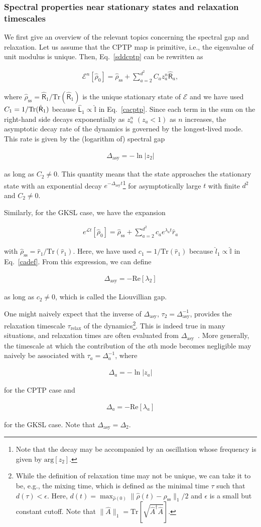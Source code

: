 \documentclass[preprint,pteplogo]{ptephy_v2}%
\numberwithin{equation}{section}
\theoremstyle{definition}
\newcommand{\ml}[1]{\mathcal{#1}}
\newcommand{\mr}[1]{\mathrm{#1}}
\newcommand{\aln}[1]{
\begin{align}
#1
\end{align}
}
\newcommand{\Tr}{\mr{Tr}}
\begin{document}
\subsubsection{Spectral properties near stationary states and relaxation timescales}
We first give an overview of the relevant topics concerning the spectral gap and relaxation.
Let us assume that the CPTP map is primitive, i.e., the eigenvalue of unit modulus is unique.
Then, Eq.~\eqref{sddcptp} can be rewritten as
\aln{
\ml{E}^n[\hat{\rho}_0]=\hat{\rho}_\mr{ss}+\sum_{a=2}^{d^2}C_az_a^n\hat{\mathsf{R}}_a,
}
where $\hat{\rho}_\mr{ss}=\hat{\mathsf{R}}_1/\mathrm{Tr}(\hat{\mathsf{R}}_1)$ is the unique stationary state of $\ml{E}$ and we have used $C_1=1/\Tr(\hat{\sf{R}}_1)$ because $\hat{\mathsf{L}}_1\propto \hat{\mathbb{I}}$ in Eq.~\eqref{cacptp}.
Since each term in the sum on the right-hand side decays exponentially as $z_a^n$ $(z_a<1)$ as $n$ increases, the asymptotic decay rate of the dynamics is governed by the longest-lived mode.
This rate is given by the (logarithm of) spectral gap
\aln{
\Delta_{\mr{asy}}=-\ln |z_2|
}
as long as $C_2\neq 0$.
This quantity means that the state approaches the stationary state with an exponential decay $e^{-\Delta_\mr{asy}t}$\footnote{
Note that the decay may be accompanied by an oscillation whose frequency is given by $\mr{arg}[z_2]$.
} for asymptotically large $t$ with finite $d^2$ and $C_2\neq 0$.

Similarly, for the GKSL case, we have the expansion
\aln{\label{expgksl}
e^{\ml{L}t}[\hat{\rho}_0]=\hat{\rho}_\mr{ss}+\sum_{a=2}^{d^2}c_ae^{\lambda_at}\hat{r}_a
}
with $\hat{\rho}_\mr{ss}=\hat{r}_1/\mathrm{Tr}(\hat{r}_1)$.
Here, we have used $c_1=1/\Tr(\hat{r}_1)$ because $\hat{l}_1\propto \hat{\mathbb{I}}$ in Eq.~\eqref{cadef}.
From this expression, we can define 
\aln{
\Delta_\mr{asy}=-\mr{Re}[\lambda_2]
}
as long as $c_2\neq 0$, which is called the Liouvillian gap.

One might naively expect that the inverse of $\Delta_\mr{asy}$, $\tau_2=\Delta_\mr{asy}^{-1}$, provides the relaxation timescale $\tau_\mr{relax}$ of the dynamics\footnote{
While the definition of relaxation time may not be unique, we can take it to be, e.g., the mixing time, which is defined as the minimal time $\tau$ such that $d(\tau)<\epsilon$. 
Here, $d(t)=\max_{\hat{\rho}(0)}\|\hat{\rho}(t)-\hat{\rho}_\mr{ss}\|_1/2$ and $\epsilon$ is a small but constant cutoff. 
Note that $\|\hat{A}\|_1=\mr{Tr}[\sqrt{\hat{A}^\dag\hat{A}}]$.
}.
This is indeed true in many situations, and relaxation times are often evaluated from $\Delta_\mr{asy}$~\cite{vznidarivc2015relaxation}.
More generally, the timescale at which the contribution of the $a$th mode becomes negligible may naively be associated with $\tau_a=\Delta_a^{-1}$, where
\aln{\label{deltacptp}
\Delta_a=-\ln |z_a|
}
for the CPTP case and
\aln{\label{deltagksl}
\Delta_a=-\mr{Re}[\lambda_a]
}
for the GKSL case. Note that $\Delta_\mr{asy}=\Delta_2$.
\end{document}
